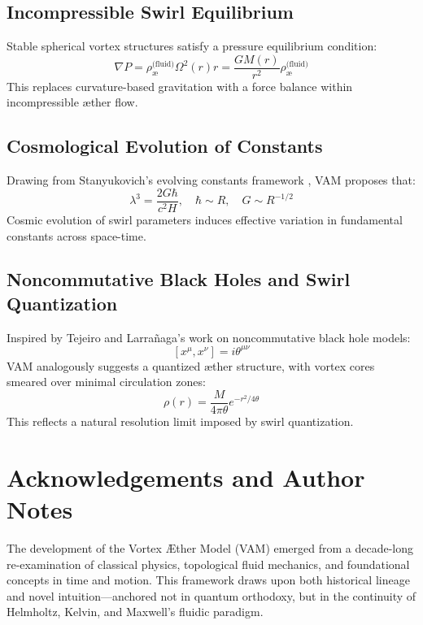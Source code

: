 \documentclass[preprint]{revtex4-2}
\begin{document}
            \subsection*{Incompressible Swirl Equilibrium}
            Stable spherical vortex structures satisfy a pressure equilibrium condition:
            \[
                \nabla P = \rho_{\text{\ae}}^{\text{(fluid)}} \Omega^2(r) r = \frac{G M(r)}{r^2} \rho_{\text{\ae}}^{\text{(fluid)}}
            \]
            This replaces curvature-based gravitation with a force balance within incompressible æther flow.

            \subsection*{Cosmological Evolution of Constants}
            Drawing from Stanyukovich’s evolving constants framework \cite{stanyukovich2008evolution}, VAM proposes that:
            \[
                \lambda^3 = \frac{2G\hbar}{c^2 H}, \quad \hbar \sim R, \quad G \sim R^{-1/2}
            \]
            Cosmic evolution of swirl parameters induces effective variation in fundamental constants across space-time.

            \subsection*{Noncommutative Black Holes and Swirl Quantization}
            Inspired by Tejeiro and Larrañaga’s work \cite{tejeiro2011noncomm} on noncommutative black hole models:
            \[
                [x^\mu, x^\nu] = i \theta^{\mu\nu}
            \]
            VAM analogously suggests a quantized æther structure, with vortex cores smeared over minimal circulation zones:
            \[
                \rho(r) = \frac{M}{4\pi \theta} e^{-r^2/4\theta}
            \]
            This reflects a natural resolution limit imposed by swirl quantization.


        \section{Acknowledgements and Author Notes}
            The development of the Vortex \AE{}ther Model (VAM) emerged from a decade-long re-examination of classical physics, topological fluid mechanics, and foundational concepts in time and motion. This framework draws upon both historical lineage and novel intuition—anchored not in quantum orthodoxy, but in the continuity of Helmholtz, Kelvin, and Maxwell's fluidic paradigm.
        
\end{document}
